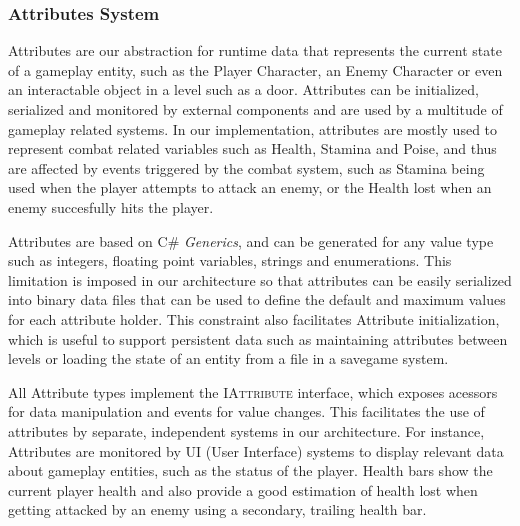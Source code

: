 
\subsubsection{Attributes System}

Attributes are our abstraction for runtime data that represents the current state of a gameplay entity, such as the Player Character, an Enemy Character or even an interactable object in a level such as a door. Attributes can be initialized, serialized and monitored by external components and are used by a multitude of gameplay related systems. In our implementation, attributes are mostly used to represent combat related variables such as Health, Stamina and Poise, and thus are affected by events triggered by the combat system, such as Stamina being used when the player attempts to attack an enemy, or the Health lost when an enemy succesfully hits the player.

Attributes are based on \textsc{C\#} \emph{Generics}, and can be generated for any value type such as integers, floating point variables, strings and enumerations. This limitation is imposed in our architecture so that attributes can be easily serialized into binary data files that can be used to define the default and maximum values for each attribute holder. This constraint also facilitates Attribute initialization, which is useful to support persistent data such as maintaining attributes between levels  or loading the state of an entity from a file in a savegame system. 

All Attribute types implement the \textsc{IAttribute} interface, which exposes acessors for data manipulation and events for value changes. This facilitates the use of attributes by separate, independent systems in our architecture. For instance, Attributes are monitored by UI (User Interface) systems to display relevant data about gameplay entities, such as the status of the player. Health bars show the current player health and also provide a good estimation of health lost when getting attacked by an enemy using a secondary, trailing health bar.

